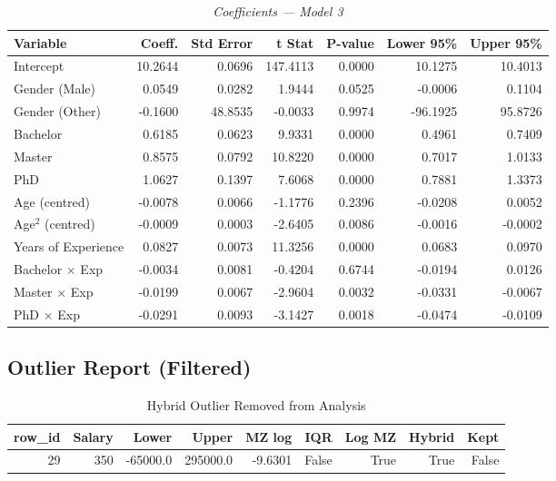 \documentclass[12pt, a4paper]{article}
\begin{document}
\begin{table}[H]
\centering\scriptsize
\caption*{\textit{Coefficients — Model 3}}
\begin{tabular}{lrrrrrr}
\toprule
\textbf{Variable} & \textbf{Coeff.} & \textbf{Std Error} & \textbf{t Stat} & \textbf{P-value} & \textbf{Lower 95\%} & \textbf{Upper 95\%} \\
\midrule
Intercept                & 10.2644 & 0.0696 & 147.4113 & 0.0000 & 10.1275 & 10.4013 \\
Gender (Male)            &  0.0549 & 0.0282 &   1.9444 & 0.0525 & -0.0006 &  0.1104 \\
Gender (Other)           & -0.1600 & 48.8535 &  -0.0033 & 0.9974 & -96.1925 & 95.8726 \\
Bachelor                 &  0.6185 & 0.0623 &   9.9331 & 0.0000 &  0.4961 &  0.7409 \\
Master                   &  0.8575 & 0.0792 &  10.8220 & 0.0000 &  0.7017 &  1.0133 \\
PhD                      &  1.0627 & 0.1397 &   7.6068 & 0.0000 &  0.7881 &  1.3373 \\
Age (centred)            & -0.0078 & 0.0066 &  -1.1776 & 0.2396 & -0.0208 &  0.0052 \\
Age$^2$ (centred)        & -0.0009 & 0.0003 &  -2.6405 & 0.0086 & -0.0016 & -0.0002 \\
Years of Experience      &  0.0827 & 0.0073 &  11.3256 & 0.0000 &  0.0683 &  0.0970 \\
Bachelor $\times$ Exp    & -0.0034 & 0.0081 &  -0.4204 & 0.6744 & -0.0194 &  0.0126 \\
Master $\times$ Exp      & -0.0199 & 0.0067 &  -2.9604 & 0.0032 & -0.0331 & -0.0067 \\
PhD $\times$ Exp         & -0.0291 & 0.0093 &  -3.1427 & 0.0018 & -0.0474 & -0.0109 \\
\bottomrule
\end{tabular}
\end{table}


\subsection{Outlier Report (Filtered)}
\begin{table}[htpb]
\centering
\scriptsize
\caption{Hybrid Outlier Removed from Analysis}
\begin{tabular}{rrrrrrrrr}
\toprule
\textbf{row\_id} & \textbf{Salary} & \textbf{Lower} & \textbf{Upper} & \textbf{MZ log} & \textbf{IQR} & \textbf{Log MZ} & \textbf{Hybrid} & \textbf{Kept} \\
\midrule
29 & 350 & -65000.0 & 295000.0 & -9.6301 & False & True & True & False \\
\bottomrule
\end{tabular}
\end{table}
\end{document}
